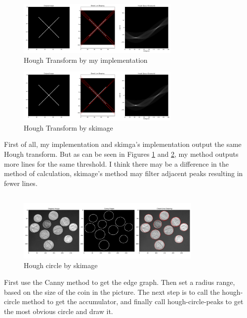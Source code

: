 \documentclass[12pt]{article}
\begin{document}
\subsection{}
\begin{figure}[ht]
    \centering
    \includegraphics[width=0.7\textwidth]{pics/A7_3.2_1.png} 
    \caption{Hough Transform by my implementation}
    \label{fig: Figure 1}
\end{figure}
\begin{figure}[ht]
    \centering
    \includegraphics[width=0.7\textwidth]{pics/A7_3.2_2.png} 
    \caption{Hough Transform by skimage}
    \label{fig: Figure 2}
\end{figure}
First of all, my implementation and skimga's implementation output the same Hough transform.
But as can be seen in Figures \ref{fig: Figure 1} and \ref{fig: Figure 2}, my method outputs more lines for the same threshold.
I think there may be a difference in the method of calculation, skimage's method may filter adjacent peaks resulting in fewer lines.
\subsection{}
\begin{figure}[ht]
    \centering
    \includegraphics[width=0.8\textwidth]{pics/A7_3.3.png} 
    \caption{Hough circle by skimage}
    \label{fig: Figure 3}
\end{figure}
First use the Canny method to get the edge graph.
Then set a radius range, based on the size of the coin in the picture. 
The next step is to call the hough-circle method to get the accumulator, and finally call hough-circle-peaks to get the most obvious circle and draw it.
\end{document}
